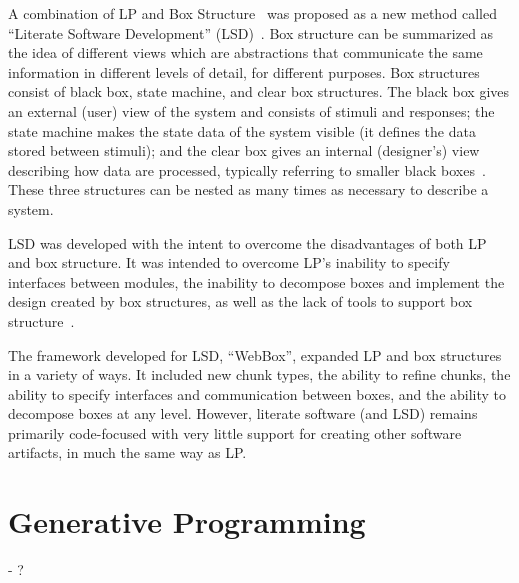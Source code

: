 A combination of LP and Box Structure~\cite{Mills1986} was proposed as a new
method called ``Literate Software Development''
(LSD)~\cite{AlMatiiAndBoujarwah2002}. Box structure can be summarized as the
idea of different views which are abstractions that communicate the same
information in different levels of detail, for different purposes. Box
structures consist of black box, state machine, and clear box structures. The
black box gives an external (user) view of the system and consists of stimuli
and responses; the state machine makes the state data of the system visible (it
defines the data stored between stimuli); and the clear box gives an internal
(designer's) view describing how data are processed, typically referring to
smaller black boxes~\cite{Mills1986}. These three structures can be nested as
many times as necessary to describe a system.

LSD was developed with the intent to overcome the disadvantages of both LP and
box structure. It was intended to overcome LP's inability to specify interfaces
between modules, the inability to decompose boxes and implement the design
created by box structures, as well as the lack of tools to support box
structure~\cite{Deck1996}.

The framework developed for LSD, ``WebBox'', expanded LP and box structures in a
variety of ways. It included new chunk types, the ability to refine chunks, the
ability to specify interfaces and communication between boxes, and the ability
to decompose boxes at any level. However, literate software (and LSD) remains
primarily code-focused with very little support for creating other software
artifacts, in much the same way as LP.

\section{Generative Programming}
 - ?

